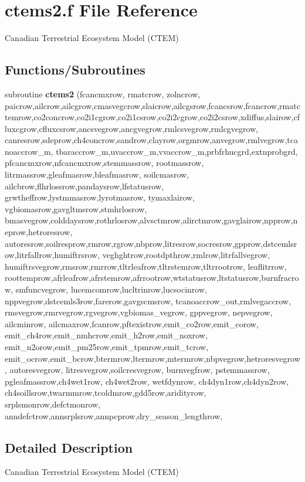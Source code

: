 \hypertarget{ctems2_8f}{}\section{ctems2.\+f File Reference}
\label{ctems2_8f}


Canadian Terrestrial Ecosystem Model (C\+T\+E\+M)  


\subsection*{Functions/\+Subroutines}
\begin{DoxyCompactItemize}
\item 
\hypertarget{ctems2_8f_a59bf665805e1461da547e6e071b0a1e3}{}subroutine {\bfseries ctems2} (fcancmxrow, rmatcrow, zolncrow, paicrow,ailcrow,ailcgrow,cmasvegcrow,slaicrow,ailcgsrow,fcancsrow,fcancrow,rmatctemrow,co2concrow,co2i1cgrow,co2i1csrow,co2i2cgrow,co2i2csrow,xdiffus,slairow,cfluxcgrow,cfluxcsrow,ancsvegrow,ancgvegrow,rmlcsvegrow,rmlcgvegrow, canresrow,sdeprow,ch4concrow,sandrow,clayrow,orgmrow,anvegrow,rmlvegrow,tcanoaccrow\+\_\+m, tbaraccrow\+\_\+m,uvaccrow\+\_\+m,vvaccrow\+\_\+m,prbfrhucgrd,extnprobgrd, pfcancmxrow,nfcancmxrow,stemmassrow, rootmassrow, litrmassrow,gleafmasrow,bleafmasrow, soilcmasrow, ailcbrow,flhrlossrow,pandaysrow,lfstatusrow, grwtheffrow,lystmmasrow,lyrotmasrow, tymaxlairow, vgbiomasrow,gavgltmsrow,stmhrlosrow, bmasvegrow,colddaysrow,rothrlosrow,alvsctmrow,alirctmrow,gavglairow,npprow,neprow,hetroresrow, autoresrow,soilresprow,rmrow,rgrow,nbprow,litresrow,socresrow,gpprow,dstcemlsrow,litrfallrow,humiftrsrow, veghghtrow,rootdpthrow,rmlrow,litrfallvegrow, humiftrsvegrow,rmsrow,rmrrow,tltrleafrow,tltrstemrow,tltrrootrow, leaflitrrow, roottemprow,afrleafrow,afrstemrow,afrrootrow,wtstatusrow,ltstatusrow,burnfracrow, smfuncvegrow, lucemcomrow,lucltrinrow,lucsocinrow, nppvegrow,dstcemls3row,farerow,gavgscmsrow, tcanoaccrow\+\_\+out,rmlvegaccrow, rmsvegrow,rmrvegrow,rgvegrow,vgbiomas\+\_\+vegrow, gppvegrow, nepvegrow, ailcminrow, ailcmaxrow,fcanrow,pftexistrow,emit\+\_\+co2row,emit\+\_\+corow, emit\+\_\+ch4row,emit\+\_\+nmhcrow,emit\+\_\+h2row,emit\+\_\+noxrow, emit\+\_\+n2orow,emit\+\_\+pm25row,emit\+\_\+tpmrow,emit\+\_\+tcrow, emit\+\_\+ocrow,emit\+\_\+bcrow,btermrow,ltermrow,mtermrow,nbpvegrow,hetroresvegrow, autoresvegrow, litresvegrow,soilcresvegrow, burnvegfrow, pstemmassrow, pgleafmassrow,ch4wet1row, ch4wet2row, wetfdynrow, ch4dyn1row,ch4dyn2row, ch4soillsrow,twarmmrow,tcoldmrow,gdd5row,aridityrow, srplsmonrow,defctmonrow, anndefctrow,annsrplsrow,annpcprow,dry\+\_\+season\+\_\+lengthrow,\label{ctems2_8f_a59bf665805e1461da547e6e071b0a1e3}

\end{DoxyCompactItemize}


\subsection{Detailed Description}
Canadian Terrestrial Ecosystem Model (C\+T\+E\+M) 

